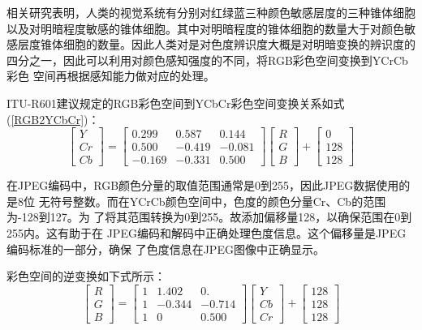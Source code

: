 \documentclass{article}
\numberwithin {equation}{section}
\begin{document}
\begin{spacing}{1.25}
    相关研究表明，人类的视觉系统有分别对红绿蓝三种颜色敏感层度的三种锥体细胞
    以及对明暗程度敏感的锥体细胞。其中对明暗程度的锥体细胞的数量大于对颜色敏
    感层度锥体细胞的数量。因此人类对是对色度辨识度大概是对明暗变换的辨识度的
    四分之一，因此可以利用对颜色感知强度的不同，将RGB彩色空间变换到YCrCb彩色
    空间再根据感知能力做对应的处理。

    ITU-R601建议规定的RGB彩色空间到YCbCr彩色空间变换关系如式(\ref{RGB2YCbCr})：
    \begin{equation}
      \begin{bmatrix}Y\\ Cr\\ Cb\end{bmatrix}=
      \begin{bmatrix}
        0.299 & 0.587 & 0.144\\
        0.500 & -0.419 & -0.081\\
        -0.169 & -0.331 & 0.500
      \end{bmatrix}
      \begin{bmatrix}R\\ G\\ B\end{bmatrix}+
      \begin{bmatrix}0\\ 128\\ 128\end{bmatrix}
      \label{RGB2YCbCr}
    \end{equation}

    在JPEG编码中，RGB颜色分量的取值范围通常是0到255，因此JPEG数据使用的是8位
    无符号整数。而在YCrCb颜色空间中，色度的颜色分量Cr、Cb的范围为-128到127。为
    了将其范围转换为0到255。故添加偏移量128，以确保范围在0到255内。这有助于在
    JPEG编码和解码中正确处理色度信息。这个偏移量是JPEG编码标准的一部分，确保
    了色度信息在JPEG图像中正确显示。

    彩色空间的逆变换如下式所示：
    \begin{equation}
      \begin{bmatrix}R\\ G\\ B\end{bmatrix}=
      \begin{bmatrix}
        1 & 1.402 & 0.\\
        1 & -0.344 & -0.714\\
        1 & 0 & 0.500
      \end{bmatrix}
      \begin{bmatrix}Y\\ Cb\\ Cr\end{bmatrix}+
      \begin{bmatrix}128\\ 128\\ 128\end{bmatrix}
      \label{YCbCr2RGB}
    \end{equation}


\end{spacing}
\end{document}
